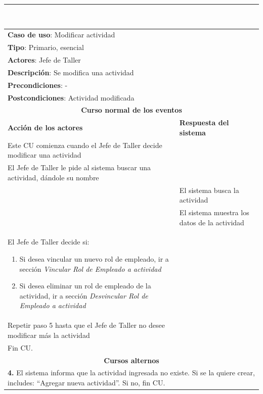 \documentclass[12pt]{extarticle}
\begin{document}
\begin{spacing}{1.2}
    \noindent\rule{169mm}{0.8mm}\\
    \setcounter{step}{0}


	\begin{longtable}{ |p{8cm}|p{8cm}| }
		\hline
		\multicolumn{2}{|p{16cm}|}{\textbf{Caso de uso}: Modificar actividad}\\
		\multicolumn{2}{|p{16cm}|}{\textbf{Tipo}: Primario, esencial}\\
		\multicolumn{2}{|p{16cm}|}{\textbf{Actores}: Jefe de Taller}\\
		\multicolumn{2}{|p{16cm}|}{\textbf{Descripción}: Se modifica una actividad}\\
		\multicolumn{2}{|p{16cm}|}{\textbf{Precondiciones}: -}\\
		\multicolumn{2}{|p{16cm}|}{\textbf{Postcondiciones}: Actividad modificada}\\
		\hline
		\multicolumn{2}{|c|}{\textbf{Curso normal de los eventos}}\\
		\hline
		\textbf{Acción de los actores} & \textbf{Respuesta del sistema}\\
		\hline
			\inc Este CU comienza cuando el Jefe de Taller decide modificar una actividad& \\
			\hline
			\inc El Jefe de Taller le pide al sistema buscar una actividad, dándole su nombre & \\
			\hline
			& \inc El sistema busca la actividad \\
			\hline
			& \inc El sistema muestra los datos de la actividad \\
			\hline
			\inc El Jefe de Taller decide si:
            \begin{enumerate}[label=(\alph*)]
                \item Si desea vincular un nuevo rol de empleado, ir a sección \textit{Vincular Rol de Empleado a actividad}
                \item Si desea eliminar un rol de empleado de la actividad, ir a sección \textit{Desvincular Rol de Empleado a actividad}
            \end{enumerate}        & \\
			\hline
			\inc  Repetir paso 5 hasta que el Jefe de Taller no desee modificar más la actividad& \\
			\hline
			\inc Fin CU. & \\
		\hline
		\multicolumn{2}{|c|}{\textbf{Cursos alternos}}\\
		\hline
        \multicolumn{2}{|p{16cm}|}{\textbf{4. }El sistema informa que la actividad ingresada no existe. Si se la quiere crear, includes: ``Agregar nueva actividad''. Si no, fin CU.}\\
		\hline
	\end{longtable}


\end{spacing}
\end{document}
